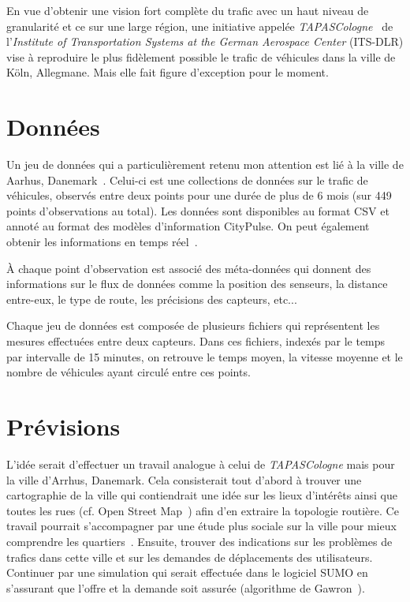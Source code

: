 En vue d'obtenir une vision fort complète du trafic avec un haut niveau de granularité et ce sur une large région, une initiative appelée \textit{TAPASCologne}~\cite{TapasCologne} de l'\textit{Institute of Transportation Systems at the
German Aerospace Center} (ITS-DLR) vise à reproduire le plus fidèlement possible le trafic de véhicules dans la ville de Köln, Allegmane. Mais elle fait figure d'exception pour le moment.

\section{Données}

Un jeu de données qui a particulièrement retenu mon attention est lié à la ville de Aarhus, Danemark~\cite{CityPulseSmartCityDataset}. Celui-ci est une collections de données sur le trafic de véhicules, observés entre deux points pour une durée de plus de 6 mois (sur 449 points d'observations au total). Les données sont disponibles au format CSV et annoté au format des modèles d'information CityPulse. On peut également obtenir les informations en temps réel~\cite{CityPulseSmartCityDatasetRealTime}.

À chaque point d'observation est associé des méta-données qui donnent des informations sur le flux de données comme la position des senseurs, la distance entre-eux, le type de route, les précisions des capteurs, etc...

Chaque jeu de données est composée de plusieurs fichiers qui représentent les mesures effectuées entre deux capteurs. Dans ces fichiers, indexés par le temps par intervalle de 15 minutes, on retrouve le temps moyen, la vitesse moyenne et le nombre de véhicules ayant circulé entre ces points.

\section{Prévisions}

L'idée serait d'effectuer un travail analogue à celui de \textit{TAPASCologne} mais pour la ville d'Arrhus, Danemark. Cela consisterait tout d'abord à trouver une cartographie de la ville qui contiendrait une idée sur les lieux d'intérêts ainsi que toutes les rues (cf. Open Street Map~\cite{OpenStreepMap}) afin d'en extraire la topologie routière. Ce travail pourrait s'accompagner par une étude plus sociale sur la ville pour mieux comprendre les quartiers~\cite{OpenDataAarhus}. Ensuite, trouver des indications sur les problèmes de trafics dans cette ville et sur les demandes de déplacements des utilisateurs. Continuer par une simulation qui serait effectuée dans le logiciel SUMO en s'assurant que l'offre et la demande soit assurée (algorithme de Gawron~\cite{gawron1998iterative}).


